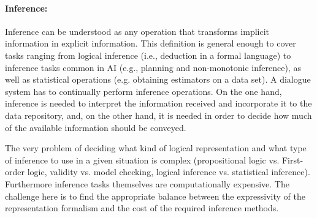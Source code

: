 
\paragraph{Inference:} Inference can be understood as any operation that
transforms implicit information in explicit information. This definition is
general enough to cover tasks ranging from logical inference (i.e., deduction in
a formal language) to inference tasks common in AI (e.g., planning and
non-monotonic inference), as well as statistical operations (e.g. obtaining
estimators on a data set). A dialogue system has to
continually perform inference operations. On the one hand, inference is needed
to interpret the information received and incorporate it to the data repository,
and, on the other hand, it is needed in order to decide how much of the
available information should be conveyed.


The very problem of deciding what kind of logical representation and what type
of inference to use in a given situation is complex (propositional logic vs.
First-order logic, validity vs. model checking, logical inference vs.
statistical inference). Furthermore inference tasks themselves are
computationally expensive. The challenge here is to find the appropriate
balance between the expressivity of the representation formalism and the
cost of the required inference methods.


